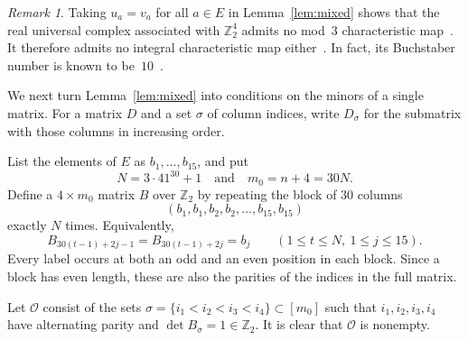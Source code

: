 \documentclass{amsart}
\theoremstyle{plain}
\numberwithin{equation}{section}
\theoremstyle{remark}
\newtheorem{remark}[theorem]{Remark}
\theoremstyle{definition}
\newcommand{\Z}{\mathbb Z}
\newcommand{\cO}{\mathcal O}
\newcommand{\wideand}{\quad \text{and} \quad}
\begin{document}
\begin{remark}
  Taking $u_a = v_a$ for all $a \in E$ in Lemma~\ref{lem:mixed} shows that the real universal complex associated with $\Z_2^4$ admits no mod~$3$ characteristic map~\cite{Baralic-Vavpetic-Vucic2024}.
  It therefore admits no integral characteristic map either~\cite{Ayzenberg2014preprint}.
  In fact, its Buchstaber number is known to be~$10$~\cite{Sun2017}.
\end{remark}

We next turn Lemma~\ref{lem:mixed} into conditions on the minors of a single matrix.
For a matrix $D$ and a set $\sigma$ of column indices, write $D_\sigma$ for the submatrix with those columns in increasing order.

List the elements of $E$ as $b_1,\ldots,b_{15}$, and put
\begin{equation}\label{eq:parameters}
    N=3\cdot41^{30}+1 \wideand m_0=n+4=30N.
\end{equation}
Define a $4\times m_0$ matrix $B$ over $\Z_2$ by repeating the block of $30$ columns
$$
    (b_1,b_1,b_2,b_2,\ldots,b_{15},b_{15})
$$
exactly $N$ times.
Equivalently,
\begin{equation}\label{eq:binary}
    B_{30(t-1)+2j-1}=B_{30(t-1)+2j}=b_j \qquad(1\le t\le N,\ 1\le j\le15).
\end{equation}
Every label occurs at both an odd and an even position in each block. Since a block has even length, these are also the parities of the indices in the full matrix.

Let $\cO$ consist of the sets $\sigma=\{i_1<i_2<i_3<i_4\}\subset[m_0]$ such that $i_1,i_2,i_3,i_4$ have alternating parity and $\det B_\sigma = 1 \in \Z_2$.
It is clear that $\cO$ is nonempty.
\end{document}
